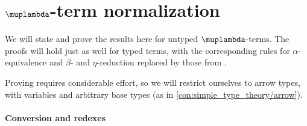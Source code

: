 \section{\texorpdfstring{\( \muplambda \)}{λ}-term normalization}\label{sec:lambda_term_normalization}

We will state and prove the results here for untyped \( \muplambda \)-terms. The proofs will hold just as well for typed terms, with the corresponding rules for \( \alpha \)-equivalence and \( \beta \)- and \( \eta \)-reduction replaced by those from .

Proving  requires considerable effort, so we will restrict ourselves to arrow types, with variables and arbitrary base types (as in \cref{con:simple_type_theory/arrow}).

\paragraph{Conversion and redexes}

